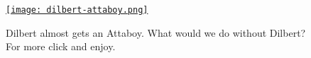 
\begin{figure}[htbp]
\centering
\href{http://www.dilbert.com/}{\texttt{[image: dilbert-attaboy.png]}}
\caption[\href{http://www.dilbert.com/}{Dilbert} almost gets an Attaboy]{Dilbert almost gets an Attaboy. What would we do without Dilbert? For more click and enjoy.}
\label{fig:4126X1}
\end{figure}







%